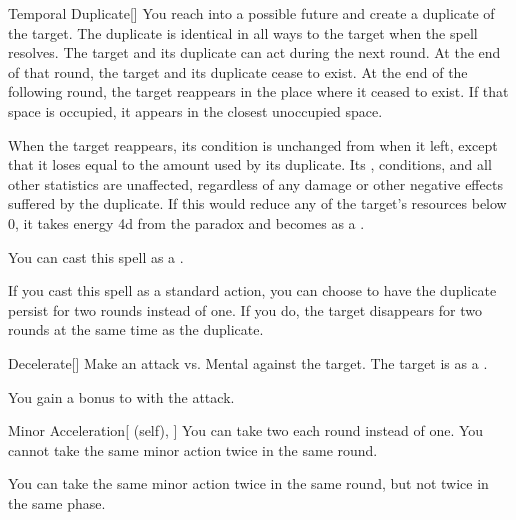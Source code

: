 \lowercase{\hypertarget{spell:Temporal Duplicate}{}}\label{spell:Temporal Duplicate}
\begin{freeability}[Rank 5]{\hypertarget{spell:Temporal Duplicate}{Temporal Duplicate}}[]
You reach into a possible future and create a duplicate of the target.
The duplicate is identical in all ways to the target when the spell resolves.
The target and its duplicate can act during the next round.
At the end of that round, the target and its duplicate cease to exist.
At the end of the following round, the target reappears in the place where it ceased to exist.
If that space is occupied, it appears in the closest unoccupied space.

When the target reappears, its condition is unchanged from when it left, except that it loses  equal to the amount used by its duplicate.
Its , conditions, and all other statistics are unaffected, regardless of any damage or other negative effects suffered by the duplicate.
If this would reduce any of the target's resources below 0, it takes energy  \plus4d from the paradox and becomes  as a .

You can cast this spell as a .

\rankline
{} If you cast this spell as a standard action, you can choose to have the duplicate persist for two rounds instead of one.
If you do, the target disappears for two rounds at the same time as the duplicate.
\end{freeability}
\vspace{0.25em}



\lowercase{\hypertarget{spell:Decelerate}{}}\label{spell:Decelerate}
\begin{freeability}[Rank 6]{\hypertarget{spell:Decelerate}{Decelerate}}[]
Make an attack vs. Mental against the target.
\hit The target is  as a .

\rankline
{} You gain a  bonus to  with the attack.
\end{freeability}
\vspace{0.25em}



\lowercase{\hypertarget{spell:Minor Acceleration}{}}\label{spell:Minor Acceleration}
\begin{attuneability}[Rank 6]{\hypertarget{spell:Minor Acceleration}{Minor Acceleration}}[ (self), ]
You can take two  each round instead of one.
You cannot take the same minor action twice in the same round.

\rankline
{} You can take the same minor action twice in the same round, but not twice in the same phase.
\end{attuneability}
\vspace{0.25em}



